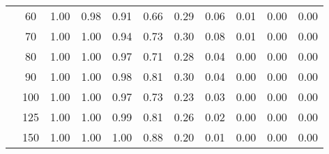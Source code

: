 \begin{table}[t]
\begin{center}
\begin{subtable}[c]{\textwidth}
\begin{center}
\begin{tabular}{rcccccccccc}
                                        & \multicolumn{1}{c|}{60}  & \num{1.00}  & \num{0.98}  & \num{0.91}  & \num{0.66}  & \num{0.29}  & \num{0.06}  & \num{0.01}  & \num{0.00}  & \num{0.00}  \\
                                        & \multicolumn{1}{c|}{70}  & \num{1.00}  & \num{1.00}  & \num{0.94}  & \num{0.73}  & \num{0.30}  & \num{0.08}  & \num{0.01}  & \num{0.00}  & \num{0.00}  \\
                                        & \multicolumn{1}{c|}{80}  & \num{1.00}  & \num{1.00}  & \num{0.97}  & \num{0.71}  & \num{0.28}  & \num{0.04}  & \num{0.00}  & \num{0.00}  & \num{0.00}  \\
                                        & \multicolumn{1}{c|}{90}  & \num{1.00}  & \num{1.00}  & \num{0.98}  & \num{0.81}  & \num{0.30}  & \num{0.04}  & \num{0.00}  & \num{0.00}  & \num{0.00}  \\
                                        & \multicolumn{1}{c|}{100}  & \num{1.00}  & \num{1.00}  & \num{0.97}  & \num{0.73}  & \num{0.23}  & \num{0.03}  & \num{0.00}  & \num{0.00}  & \num{0.00}  \\
                                        & \multicolumn{1}{c|}{125}  & \num{1.00}  & \num{1.00}  & \num{0.99}  & \num{0.81}  & \num{0.26}  & \num{0.02}  & \num{0.00}  & \num{0.00}  & \num{0.00}  \\
                                        & \multicolumn{1}{c|}{150}  & \num{1.00}  & \num{1.00}  & \num{1.00}  & \num{0.88}  & \num{0.20}  & \num{0.01}  & \num{0.00}  & \num{0.00}  & \num{0.00}  \\
                                    \end{tabular}
            \end{center}
        \end{subtable}

        \vspace{5mm}


\end{center}
\end{table}
